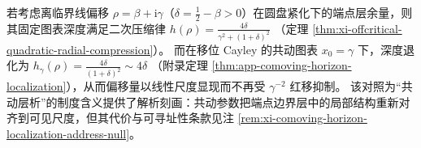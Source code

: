 \begin{remark}\label{rem:xi-horizon-comoving-vs-redshift}
若考虑离临界线偏移 \(\rho=\beta+\mathrm{i}\gamma\)（\(\delta=\tfrac12-\beta>0\)）在圆盘紧化下的端点层余量，则其固定图表深度满足二次压缩律
\(
h(\rho)=\frac{4\delta}{\gamma^2+(1+\delta)^2}
\)
（定理 \ref{thm:xi-offcritical-quadratic-radial-compression}）。
而在移位 Cayley 的共动图表 \(x_0=\gamma\) 下，深度退化为
\(
h_{\gamma}(\rho)=\frac{4\delta}{(1+\delta)^2}\sim 4\delta
\)
（附录定理 \ref{thm:app-comoving-horizon-localization}），从而偏移量以线性尺度显现而不再受 \(\gamma^{-2}\) 红移抑制。
该对照为“共动层析”的制度含义提供了解析刻画：共动参数把端点边界层中的局部结构重新对齐到可见尺度，但其代价与可寻址性条款见注 \ref{rem:xi-comoving-horizon-localization-address-null}。
\end{remark}

